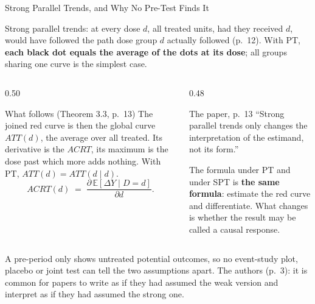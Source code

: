 \documentclass[main.tex]{subfiles}
\begin{document}
\begin{frame}{Strong Parallel Trends, and Why No Pre-Test Finds It}

  Strong parallel trends: at every dose $d$, all treated units, had they
  received $d$, would have followed the path dose group $d$ actually followed
  (p.~12). With PT, \textbf{each black dot equals the average of the dots at
  its dose}; all groups sharing one curve is the simplest case.

  \medskip
  \begin{columns}[T]
    \begin{column}{0.50\textwidth}
      \begin{block}{\footnotesize What follows (Theorem 3.3, p.~13)}
        \footnotesize
        The joined red curve is then the global curve $ATT(d)$, the average
        over all treated. Its derivative is the $ACRT$, its maximum is the dose
        past which more adds nothing. With PT, $ATT(d) = ATT(d\mid d)$.
        \[
          ACRT(d) \;=\; \frac{\partial\, \mathbb{E}[\Delta Y \mid D=d]}{\partial d}.
        \]
      \end{block}
    \end{column}
    \begin{column}{0.48\textwidth}
      \begin{alertblock}{\footnotesize The paper, p.~13}
        \footnotesize
        ``Strong parallel trends only changes the interpretation of the
        estimand, not its form.''
      \end{alertblock}
      \smallskip
      \footnotesize The formula under PT and under SPT is \textbf{the same
      formula}: estimate the red curve and differentiate. What changes is
      whether the result may be called a causal response.
    \end{column}
  \end{columns}

  \medskip
  \footnotesize A pre-period only shows untreated potential outcomes, so no
  event-study plot, placebo or joint test can tell the two assumptions apart.
  The authors (p.~3): it is common for papers to write as if they had assumed
  the weak version and interpret as if they had assumed the strong one.

\end{frame}
\end{document}
